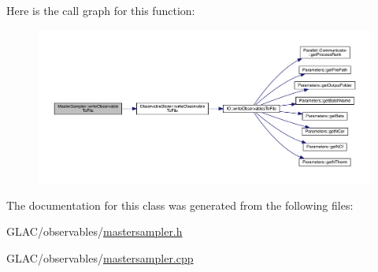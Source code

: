 Here is the call graph for this function\+:\nopagebreak
\begin{figure}[H]
\begin{center}
\leavevmode
\includegraphics[width=350pt]{class_master_sampler_a638714c38e1a6252ab8b6be1fa224bd4_cgraph}
\end{center}
\end{figure}


The documentation for this class was generated from the following files\+:\begin{DoxyCompactItemize}
\item 
G\+L\+A\+C/observables/\mbox{\hyperlink{mastersampler_8h}{mastersampler.\+h}}\item 
G\+L\+A\+C/observables/\mbox{\hyperlink{mastersampler_8cpp}{mastersampler.\+cpp}}\end{DoxyCompactItemize}
